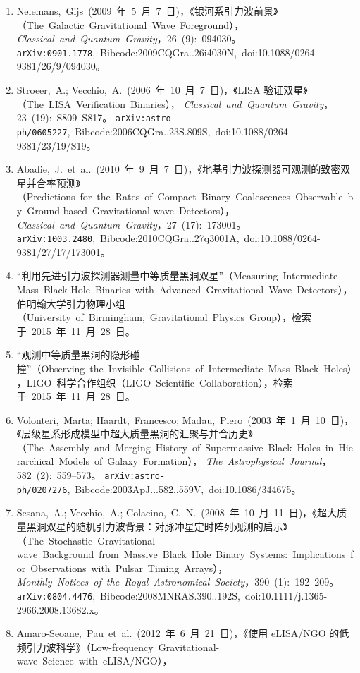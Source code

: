 \begin{enumerate}
  \item Nelemans,~Gijs~(2009~年~5~月~7~日)，《银河系引力波前景》（The~Galactic~Gravitational~Wave~Foreground），%
        \textit{Classical~and~Quantum~Gravity}，26~(9):~094030。%
        \texttt{arXiv:0901.1778},~Bibcode:2009CQGra..26i4030N,~doi:10.1088/0264-9381/26/9/094030。
  \item Stroeer,~A.; Vecchio,~A.~(2006~年~10~月~7~日)，《LISA 验证双星》（The~LISA~Verification~Binaries），%
        \textit{Classical~and~Quantum~Gravity}，23~(19):~S809–S817。%
        \texttt{arXiv:astro-ph/0605227},~Bibcode:2006CQGra..23S.809S,~doi:10.1088/0264-9381/23/19/S19。
  \item Abadie,~J.~et~al.~(2010~年~9~月~7~日)，《地基引力波探测器可观测的致密双星并合率预测》（Predictions~for~the~Rates~of~Compact~Binary~Coalescences~Observable~by~Ground-based~Gravitational-wave~Detectors），%
        \textit{Classical~and~Quantum~Gravity}，27~(17):~173001。%
        \texttt{arXiv:1003.2480},~Bibcode:2010CQGra..27q3001A,~doi:10.1088/0264-9381/27/17/173001。
  \item “利用先进引力波探测器测量中等质量黑洞双星”（Measuring~Intermediate-Mass~Black-Hole~Binaries~with~Advanced~Gravitational~Wave~Detectors），%
        伯明翰大学引力物理小组（University~of~Birmingham,~Gravitational~Physics~Group），检索于~2015~年~11~月~28~日。
  \item “观测中等质量黑洞的隐形碰撞”（Observing~the~Invisible~Collisions~of~Intermediate~Mass~Black~Holes），LIGO~科学合作组织（LIGO~Scientific~Collaboration），检索于~2015~年~11~月~28~日。
  \item Volonteri,~Marta; Haardt,~Francesco; Madau,~Piero~(2003~年~1~月~10~日)，《层级星系形成模型中超大质量黑洞的汇聚与并合历史》（The~Assembly~and~Merging~History~of~Supermassive~Black~Holes~in~Hierarchical~Models~of~Galaxy~Formation），%
        \textit{The~Astrophysical~Journal}，582~(2):~559–573。%
        \texttt{arXiv:astro-ph/0207276},~Bibcode:2003ApJ...582..559V,~doi:10.1086/344675。
  \item Sesana,~A.; Vecchio,~A.; Colacino,~C.~N.~(2008~年~10~月~11~日)，《超大质量黑洞双星的随机引力波背景：对脉冲星定时阵列观测的启示》（The~Stochastic~Gravitational-wave~Background~from~Massive~Black~Hole~Binary~Systems:~Implications~for~Observations~with~Pulsar~Timing~Arrays），%
        \textit{Monthly~Notices~of~the~Royal~Astronomical~Society}，390~(1):~192–209。%
        \texttt{arXiv:0804.4476},~Bibcode:2008MNRAS.390..192S,~doi:10.1111/j.1365-2966.2008.13682.x。
  \item Amaro-Seoane,~Pau~et~al.~(2012~年~6~月~21~日)，《使用 eLISA/NGO 的低频引力波科学》（Low-frequency~Gravitational-wave~Science~with~eLISA/NGO），%

\end{enumerate}
